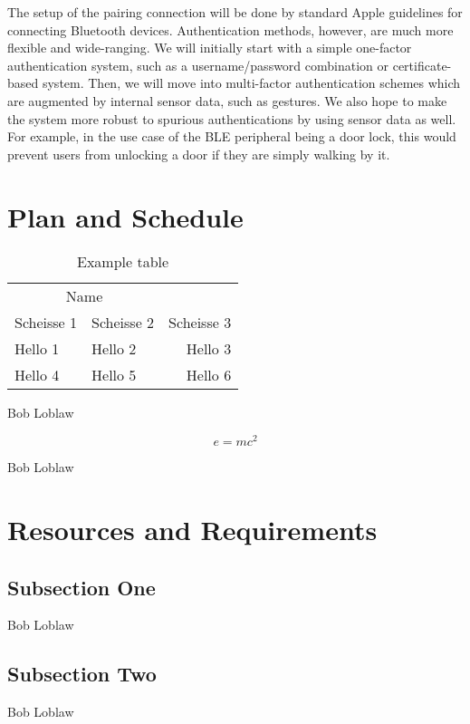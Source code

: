\documentclass[twoside]{article}
\begin{document}
\begin{multicols}{2}
The setup of the pairing connection will be done by standard Apple guidelines for connecting
Bluetooth devices. Authentication methods, however, are much more flexible and wide-ranging.
We will initially start with a simple one-factor authentication system, such as a username/password
combination or certificate-based system. Then, we will move into multi-factor authentication
schemes which are augmented by internal sensor data, such as gestures. We also hope to make the
system more robust to spurious authentications by using sensor data as well. For example, in the
use case of the BLE peripheral being a door lock, this would prevent users from unlocking a door
if they are simply walking by it.


\section{Plan and Schedule}

\begin{table}[H]
\caption{Example table}
\centering
\begin{tabular}{llr}
\toprule
\multicolumn{2}{c}{Name} \\
\cmidrule(r){1-2}
Scheisse 1 & Scheisse 2 & Scheisse 3 \\
\midrule
Hello 1 & Hello 2 & Hello 3 \\
Hello 4 & Hello 5 & Hello 6 \\
\bottomrule
\end{tabular}
\end{table}

Bob Loblaw

\begin{equation}
\label{eq:emc}
e = mc^2
\end{equation}

Bob Loblaw


\section{Resources and Requirements}

\subsection{Subsection One}

Bob Loblaw

\subsection{Subsection Two}

Bob Loblaw

\end{multicols}
\end{document}

